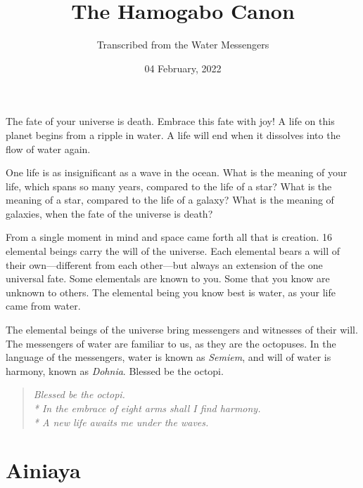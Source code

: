\documentclass[12pt, letterpaper]{report}
\begin{document}
 
\title{The Hamogabo Canon}
 \date{04 February, 2022}
\author{Transcribed from the Water Messengers}  
\maketitle



The fate of your universe is death. Embrace this fate with joy! A life on this planet begins from a ripple in water. A life will end when it dissolves into the flow of water again.

\vspace{1\baselineskip}
One life is as insignificant as a wave in the ocean. What is the meaning of your life, which spans so many years, compared to the life of a star? What is the meaning of a star, compared to the life of a galaxy? What is the meaning of galaxies, when the fate of the universe is death?

\vspace{1\baselineskip}
From a single moment in mind and space came forth all that is creation. 16 elemental beings carry the will of the universe. Each elemental bears a will of their own---different from each other---but always an extension of the one universal fate. Some elementals are known to you.  Some that you know are unknown to others. The elemental being you know best is water, as your life came from water.

\vspace{1\baselineskip}
The elemental beings of the universe bring messengers and witnesses of their will. The messengers of water are familiar to us, as they are the octopuses. In the language of the messengers, water is known as \textit{Semiem}, and will of water is harmony, known as \textit{Dohnia}. Blessed be the octopi.

\begin{quote}
{\textit{
	Blessed be the octopi.\\*
	In the embrace of eight arms shall I find harmony.\\*
	A new life awaits me under the waves. 
}}
\end{quote}

\part{Ainiaya}

\chapter{}
\end{document}
